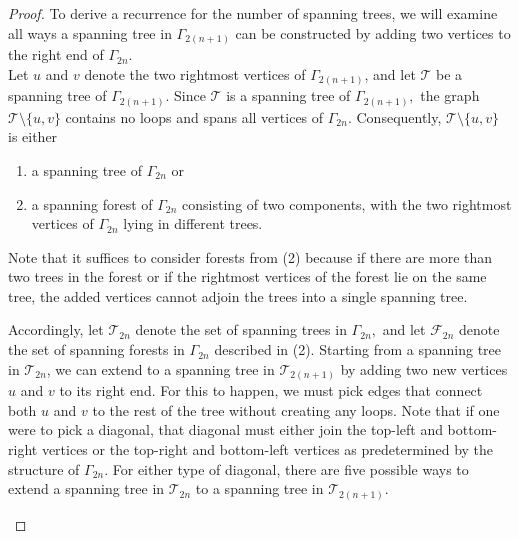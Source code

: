 \documentclass{amsart}
\theoremstyle{definition}
\begin{document}
\begin{proof}
To derive a recurrence for the number of spanning trees, we will examine all ways a spanning tree in $\Gamma_{2(n+1)}$ can be constructed by adding two vertices to the right end of $\Gamma_{2n}$.\\
\indent Let $u$ and $v$ denote the two rightmost vertices of $\Gamma_{2(n+1)}$, and let $\mathcal{T}$ be a spanning tree of $\Gamma_{2(n+1)}.$ Since $\mathcal{T}$ is a spanning tree of $\Gamma_{2(n+1)},$ the graph $\mathcal{T} \setminus \{u,v\}$ contains no loops and spans all vertices of $\Gamma_{2n}.$ Consequently, $\mathcal{T}\setminus\{u,v\}$ is either
\begin{enumerate}
    \item a spanning tree of $\Gamma_{2n}$ or
    \item a spanning forest of $\Gamma_{2n}$ consisting of two components, with the two rightmost vertices of $\Gamma_{2n}$ lying in different trees.
\end{enumerate}

Note that it suffices to consider forests from (2) because if there are more than two trees in the forest or if the rightmost vertices of the forest lie on the same tree, the added vertices cannot adjoin the trees into a single spanning tree.

\indent Accordingly, let $\mathscr{T}_{2n}$ denote the set of spanning trees in $\Gamma_{2n},$ and let $\mathscr{F}_{2n}$ denote the set of spanning forests in $\Gamma_{2n}$ described in (2). Starting from a spanning tree in $\mathscr{T}_{2n}$, we can extend to a spanning tree in $\mathscr{T}_{2(n+1)}$ by adding two new vertices $u$ and $v$ to its right end. For this to happen, we must pick edges that connect both $u$ and $v$ to the rest of the tree without creating any loops. Note that if one were to pick a diagonal, that diagonal must either join the top-left and bottom-right vertices or the top-right and bottom-left vertices as predetermined by the structure of $\Gamma_{2n}.$ For either type of diagonal, there are five possible ways to extend a spanning tree in $\mathscr{T}_{2n}$ to a spanning tree in $\mathscr{T}_{2(n+1)}.$

\begin{figure}[H]
    \centering
\end{figure}
\end{proof}
\end{document}

